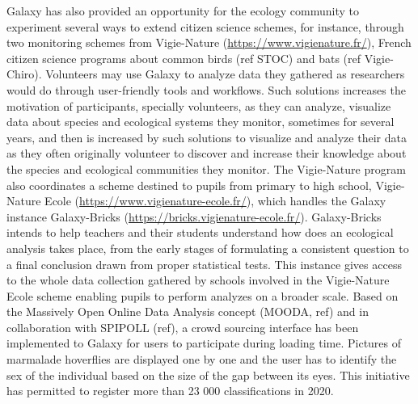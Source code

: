 \documentclass[10pt,letterpaper]{article}
\begin{document}
Galaxy has also provided an opportunity for the ecology community to experiment several ways to extend citizen science schemes, for instance, through two monitoring schemes from Vigie-Nature (\url{https://www.vigienature.fr/}), French citizen science programs about common birds (ref STOC) and bats (ref Vigie-Chiro). Volunteers may use Galaxy to analyze data they gathered as researchers would do through user-friendly tools and workflows. Such solutions increases the motivation of participants, specially volunteers, as they can analyze, visualize data about species and ecological systems they monitor, sometimes for several years, and then is increased by such solutions to visualize and analyze their data as they often originally volunteer to discover and increase their knowledge about the species and ecological communities they monitor.
The Vigie-Nature program also coordinates a scheme destined to pupils from primary to high school, Vigie-Nature Ecole (\url{https://www.vigienature-ecole.fr/}), which handles the Galaxy instance Galaxy-Bricks (\url{https://bricks.vigienature-ecole.fr/}). Galaxy-Bricks intends to help teachers and their students understand how does an ecological analysis takes place, from the early stages of formulating a consistent question to a final conclusion drawn from proper statistical tests. This instance gives access to the whole data collection gathered by schools involved in the Vigie-Nature Ecole scheme enabling pupils to perform analyzes on a broader scale.
Based on the Massively Open Online Data Analysis concept (MOODA, ref) and in collaboration with SPIPOLL (ref), a crowd sourcing interface has been implemented to Galaxy for users to participate during loading time. Pictures of marmalade hoverflies are displayed one by one and the user has to identify the sex of the individual based on the size of the gap between its eyes. This initiative has permitted to register more than 23 000 classifications in 2020.
\end{document}
